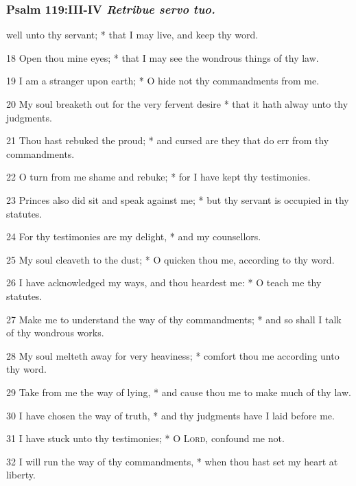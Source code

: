 \subsubsection{Psalm 119:III-IV \textit{Retribue servo tuo.}}
 well unto thy servant; * that I may live, and keep thy word.\par
18 Open thou mine eyes; * that I may see the wondrous things of thy law.\par
19 I am a stranger upon earth; * O hide not thy commandments from me.\par
20 My soul breaketh out for the very fervent desire * that it hath alway unto thy judgments.\par
21 Thou hast rebuked the proud; * and cursed are they that do err from thy commandments.\par
22 O turn from me shame and rebuke; * for I have kept thy testimonies.\par
23 Princes also did sit and speak against me; * but thy servant is occupied in thy statutes.\par
24 For thy testimonies are my delight, * and my counsellors.
\par
25 My soul cleaveth to the dust; * O quicken thou me, according to thy word.
\par
    26 I have acknowledged my ways, and thou heardest me: * O teach me thy statutes.
\par
    27 Make me to understand the way of thy commandments; * and so shall I talk of thy wondrous works.
\par
    28 My soul melteth away for very heaviness; * comfort thou me according unto thy word.
\par
    29 Take from me the way of lying, * and cause thou me to make much of thy law.
\par
    30 I have chosen the way of truth, * and thy judgments have I laid before me.
\par
    31 I have stuck unto thy testimonies; * O \textsc{Lord}, confound me not.
\par
    32 I will run the way of thy commandments, * when thou hast set my heart at liberty.
